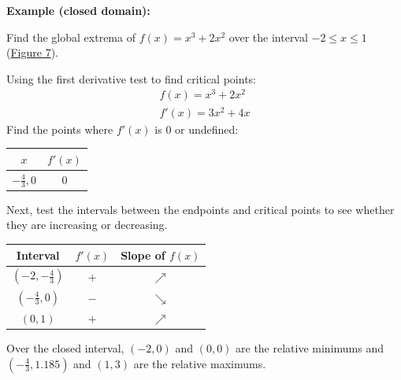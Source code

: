 \documentclass[12pt]{article}
\begin{document}
\noindent \textbf{Example (closed domain):}

\noindent Find the global extrema of $f(x) = x^3+2x^2$ over the interval $-2 \le x \le 1$ (\hyperref[fig:absextremaclosed]{Figure 7}).

\noindent Using the first derivative test to find critical points:
\begin{gather*}
	f(x) = x^3 + 2x^2 \\
	f'(x) = 3x^2 + 4x
\end{gather*}
Find the points where $f'(x)$ is $0$ or undefined:
\begin{center}
	\begin{tabular}{|c|c|}
		\hline
		$x$               & $f'(x)$ \\
		\hline \hline
		$-\frac{4}{3}, 0$ & $0$     \\
		\hline
	\end{tabular}
\end{center}
Next, test the intervals between the endpoints and critical points to see whether they are increasing or decreasing.
\begin{center}
	\begin{tabular}{|c|c|c|}
		\hline
		Interval             & $f'(x)$ & Slope of $f(x)$ \\
		\hline \hline
		$(-2, -\frac{4}{3})$ & $+$     & $\nearrow$      \\
		\hline
		$(-\frac{4}{3}, 0)$  & $-$     & $\searrow$      \\
		\hline
		$(0, 1)$             & $+$     & $\nearrow$      \\
		\hline
	\end{tabular}
\end{center}
Over the closed interval, $(-2, 0)$ and $(0, 0)$ are the relative minimums and $(-\frac{4}{3}, 1.185)$ and $(1, 3)$ are the relative maximums.
\end{document}
